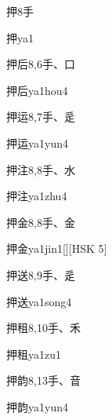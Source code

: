 \begin{entry}{押}{8}{⼿}
  \begin{phonetics}{押}{ya1}
  \end{phonetics}
\end{entry}

\begin{entry}{押后}{8,6}{⼿、⼝}
  \begin{phonetics}{押后}{ya1hou4}
  \end{phonetics}
\end{entry}

\begin{entry}{押运}{8,7}{⼿、⾡}
  \begin{phonetics}{押运}{ya1yun4}
  \end{phonetics}
\end{entry}

\begin{entry}{押注}{8,8}{⼿、⽔}
  \begin{phonetics}{押注}{ya1zhu4}
  \end{phonetics}
\end{entry}

\begin{entry}{押金}{8,8}{⼿、⾦}
  \begin{phonetics}{押金}{ya1jin1}[][HSK 5]
  \end{phonetics}
\end{entry}

\begin{entry}{押送}{8,9}{⼿、⾡}
  \begin{phonetics}{押送}{ya1song4}
  \end{phonetics}
\end{entry}

\begin{entry}{押租}{8,10}{⼿、⽲}
  \begin{phonetics}{押租}{ya1zu1}
  \end{phonetics}
\end{entry}

\begin{entry}{押韵}{8,13}{⼿、⾳}
  \begin{phonetics}{押韵}{ya1yun4}
  \end{phonetics}
\end{entry}


